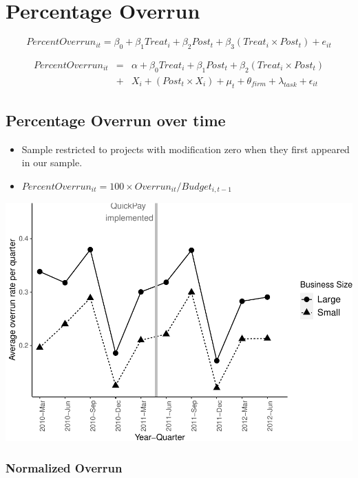 \documentclass[
]{article}
\providecommand{\tightlist}{%
  \setlength{\itemsep}{0pt}\setlength{\parskip}{0pt}}
\begin{document}
\hypertarget{percentage-overrun}{%
\section{Percentage Overrun}\label{percentage-overrun}}

\[ PercentOverrun_{it} = \beta_0 + \beta_1 Treat_i + \beta_2 Post_t + \beta_3 (Treat_i \times Post_t) + e_{it}\]

\[ \begin{aligned} PercentOverrun_{it} &=& \alpha+\beta_0 Treat_i + \beta_1 Post_t + \beta_2 (Treat_i \times Post_t)\\
&+&  X_i + (Post_t \times X_i) + \mu_t + \theta_{firm} + \lambda_{task}+ \epsilon_{it}
\end{aligned}\]

\hypertarget{percentage-overrun-over-time}{%
\subsection{Percentage Overrun over
time}\label{percentage-overrun-over-time}}

\begin{itemize}
\tightlist
\item
  Sample restricted to projects with modification zero when they first
  appeared in our sample.
\item
  \(PercentOverrun_{it}=100 \times Overrun_{it}/Budget_{i,t-1}\)
\end{itemize}

\includegraphics{qp_first_budget_overrun_files/figure-latex/plot_pc_overrun-1.pdf}

\hypertarget{normalized-overrun-1}{%
\subsubsection{Normalized Overrun}\label{normalized-overrun-1}}
\end{document}
